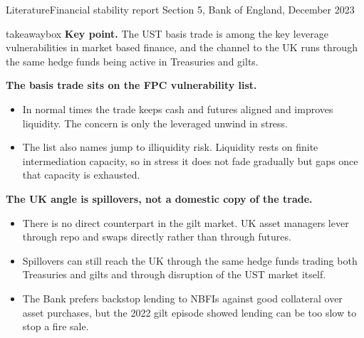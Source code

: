 \documentclass[aspectratio=169,11pt]{beamer}
\newcommand{\keypoint}[1]{%
  \begin{beamercolorbox}[sep=0.6em,wd=\textwidth]{takeawaybox}
    \textbf{Key point.} #1
  \end{beamercolorbox}}
\begin{document}
\begin{frame}{Literature}{Financial stability report Section 5, Bank of England, December 2023}
  \footnotesize
  \keypoint{The UST basis trade is among the key leverage vulnerabilities in market based finance, and the channel to the UK runs through the same hedge funds being active in Treasuries and gilts.}
  \medskip
  \textbf{The basis trade sits on the FPC vulnerability list.}
  \begin{itemize}
    \item In normal times the trade keeps cash and futures aligned and improves liquidity. The concern is only the leveraged unwind in stress.
    \item The list also names jump to illiquidity risk. Liquidity rests on finite intermediation capacity, so in stress it does not fade gradually but gaps once that capacity is exhausted.
  \end{itemize}
  \smallskip
  \textbf{The UK angle is spillovers, not a domestic copy of the trade.}
  \begin{itemize}
    \item There is no direct counterpart in the gilt market. UK asset managers lever through repo and swaps directly rather than through futures.
    \item Spillovers can still reach the UK through the same hedge funds trading both Treasuries and gilts and through disruption of the UST market itself.
    \item The Bank prefers backstop lending to NBFIs against good collateral over asset purchases, but the 2022 gilt episode showed lending can be too slow to stop a fire sale.
  \end{itemize}
\end{frame}
\end{document}
